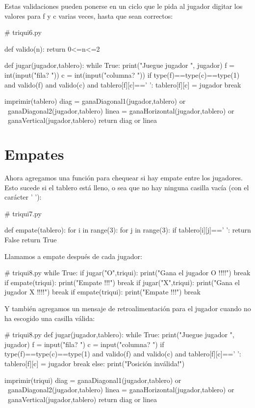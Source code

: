 Estas validaciones pueden ponerse en un ciclo que le pida al jugador
digitar los valores para f y c varias veces, hasta que sean correctos:

\begin{pythoncode}
# triqui6.py

def valido(n):
    return 0<=n<=2
    
def jugar(jugador,tablero):
    while True:     
        print("Juegue jugador ", jugador)
        f = int(input("fila? "))
        c = int(input("columna? "))
        if type(f)==type(c)==type(1) and valido(f) 
           and valido(c) and tablero[f][c]==' ':
            tablero[f][c] = jugador
            break      

    imprimir(tablero)
    diag = ganaDiagonal1(jugador,tablero) or \
           ganaDiagonal2(jugador,tablero)
    linea = ganaHorizontal(jugador,tablero) or \
            ganaVertical(jugador,tablero)
    return  diag or linea
\end{pythoncode}

\section{Empates}

Ahora agregamos una función para chequear si hay empate entre los
jugadores. Esto sucede si el tablero está lleno, o sea que no hay
ninguna casilla vacía (con el carácter ' '):

\begin{pythoncode}
# triqui7.py

def empate(tablero):
    for i in range(3):
        for j in range(3):
            if tablero[i][j]==' ':
                return False
    return True
\end{pythoncode}

Llamamos a empate después de cada jugador: 

\begin{pythoncode}
# triqui8.py
while True:
    if jugar("O",triqui):
        print("Gana el jugador O !!!!")
        break
    if empate(triqui):
        print("Empate !!!")
        break
    if jugar("X",triqui):
        print("Gana el jugador X !!!!")
        break
    if empate(triqui):
        print("Empate !!!")
        break
\end{pythoncode}

Y también agregamos un mensaje de retroalimentación para el jugador
cuando no ha escogido una casilla válida:

\begin{pythoncode}
# triqui8.py
def jugar(jugador,tablero):
    while True:     
        print("Juegue jugador ", jugador)
        f = input("fila? ")
        c = input("columna? ")
        if type(f)==type(c)==type(1) and valido(f) 
           and valido(c) and tablero[f][c]==' ':
            tablero[f][c] = jugador
            break
        else:
            print("Posición inválida!")

    imprimir(triqui)
    diag = ganaDiagonal1(jugador,tablero) or \
           ganaDiagonal2(jugador,tablero)
    linea = ganaHorizontal(jugador,tablero) or \
            ganaVertical(jugador,tablero)
    return  diag or linea
\end{pythoncode}

